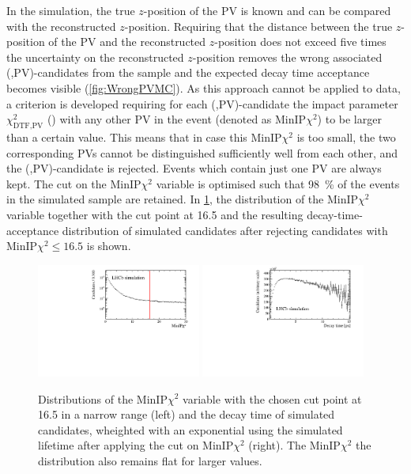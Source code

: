 In the simulation, the true $z$-position of the \ac{PV} is known and can be compared with the reconstructed $z$-position.
Requiring that the distance between the true $z$-position of the \ac{PV} and the reconstructed $z$-position does not exceed five times the uncertainty on the reconstructed $z$-position removes the wrong associated (\Bz,\ac{PV})-candidates from the sample and the expected decay time acceptance becomes visible (\cref{fig:WrongPVMC}).
As this approach cannot be applied to data, a criterion is developed requiring for each (\Bz,\ac{PV})-candidate the impact parameter $\chi^2_{\text{DTF,PV}}$ (\chisqip) with any other \ac{PV} in the event (denoted as $\text{MinIP}\chi^2$) to be larger than a certain value.
This means that in case this $\text{MinIP}\chi^2$ is too small, the two corresponding \ac{PV}s cannot be distinguished sufficiently well from each other, and the (\Bz,\ac{PV})-candidate is rejected.
Events which contain just one \ac{PV} are always kept.
The cut on the $\text{MinIP}\chi^2$ variable is optimised such that \SI{98}{\percent} of the events in the simulated \BdToDpi sample are retained.
In \cref{fig:WrongPVData}, the distribution of the $\text{MinIP}\chi^2$ variable together with the cut point at \num{16.5} and the resulting decay-time-acceptance distribution of simulated candidates after rejecting candidates with $\text{MinIP}\chi^2\le\num{16.5}$ is shown.
\begin{figure}[tbp]
    \centering
    \includegraphics[width=0.48\textwidth]{06selection/figs/MinIPCHI2.pdf}
    \includegraphics[width=0.48\textwidth]{06selection/figs/WrongPVs-WeightingGoodData.pdf}
    \caption{Distributions of the $\text{MinIP}\chi^2$ variable with the chosen cut point at \num{16.5} in a narrow range (left) and the decay time of simulated \BdToDpi candidates, wheighted with an exponential using the simulated \Bz lifetime after applying the cut on $\text{MinIP}\chi^2$ (right). The $\text{MinIP}\chi^2$ the distribution also remains flat for larger values.}
    \label{fig:WrongPVData}
\end{figure}

